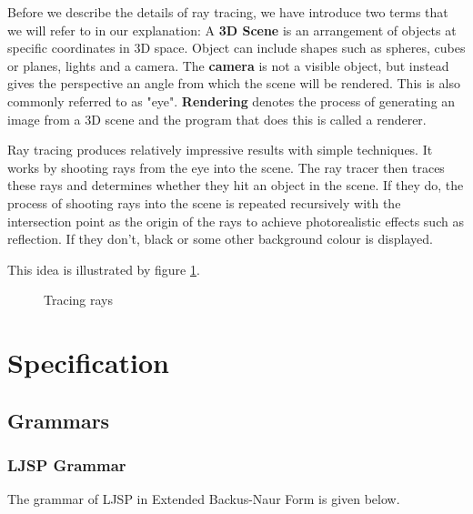\documentclass[11pt]{report}
\begin{document}
Before we describe the details of ray tracing, we have introduce two terms that we will refer to in our explanation: A \textbf{3D Scene} is an arrangement of objects at specific coordinates in 3D space. Object can include shapes such as spheres, cubes or planes, lights and a camera. The \textbf{camera} is not a visible object, but instead gives the perspective an angle from which the scene will be rendered. This is also commonly referred to as "eye". \textbf{Rendering} denotes the process of generating an image from a 3D scene and the program that does this is called a renderer.

Ray tracing produces relatively impressive results with simple techniques. It works by shooting rays from the eye into the scene. The ray tracer then traces these rays and determines whether they hit an object in the scene. If they do, the process of shooting rays into the scene is repeated recursively with the intersection point as the origin of the rays to achieve photorealistic effects such as reflection. If they don't, black or some other background colour is displayed.

This idea is illustrated by figure \ref{raytracingexplanation}.

\begin{figure}[ht]
\caption{Tracing rays}
\label{raytracingexplanation}
\end{figure}



\chapter{Specification}
\section{Grammars}
\subsection{LJSP Grammar}
The grammar of LJSP in Extended Backus-Naur Form is given below.
\end{document}
